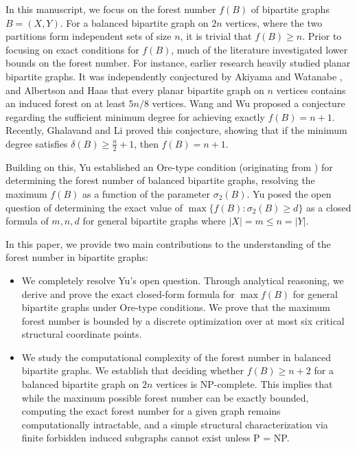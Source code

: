 \documentclass[a4paper]{amsart}
\begin{document}
In this manuscript, we focus on the forest number $f(B)$ of bipartite graphs $B = (X, Y)$.
For a balanced bipartite graph on $2n$ vertices, where the two partitions form independent sets of size $n$, it is trivial that $f(B) \ge n$.
Prior to focusing on exact conditions for $f(B)$, much of the literature investigated lower bounds on the forest number. 
For instance, earlier research heavily studied planar bipartite graphs.
It was independently conjectured by Akiyama and Watanabe \cite{Akiyama1987}, and Albertson and Haas \cite{Albertson1998} that every planar bipartite graph on $n$ vertices contains an induced forest on at least $5n/8$ vertices.
Wang and Wu \cite{WangWu2023} proposed a conjecture regarding the sufficient minimum degree for achieving exactly $f(B)=n+1$.
Recently, Ghalavand and Li \cite{ghalavand2025} proved this conjecture, showing that if the minimum degree satisfies $\delta(B) \ge \frac{n}{2} + 1$, then $f(B) = n+1$.

Building on this, Yu \cite{yu2026} established an Ore-type condition (originating from \cite{ore1960}) for determining the forest number of balanced bipartite graphs, resolving the maximum $f(B)$ as a function of the parameter $\sigma_2(B)$.
Yu posed the open question of determining the exact value of $\max \{f(B) : \sigma_2(B) \ge d\}$ as a closed formula of $m, n, d$ for general bipartite graphs where $|X| = m \le n = |Y|$.

In this paper, we provide two main contributions to the understanding of the forest number in bipartite graphs:
\begin{itemize}
    \item We completely resolve Yu's open question. Through analytical reasoning, we derive and prove the exact closed-form formula for $\max f(B)$ for general bipartite graphs under Ore-type conditions. We prove that the maximum forest number is bounded by a discrete optimization over at most six critical structural coordinate points. 
    \item We study the computational complexity of the forest number in balanced bipartite graphs. We establish that deciding whether $f(B) \ge n+2$ for a balanced bipartite graph on $2n$ vertices is NP-complete. This implies that while the maximum possible forest number can be exactly bounded, computing the exact forest number for a given graph remains computationally intractable, and a simple structural characterization via finite forbidden induced subgraphs cannot exist unless P = NP.
\end{itemize}
\end{document}

